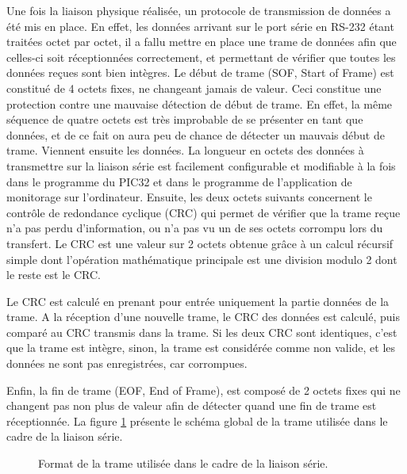 \documentclass[letterpaper, twoside, 12pt, memoire, creativecommons, hyperref]{thETS}
\begin{document}
Une fois la liaison physique réalisée, un protocole de transmission de données a été mis en place. En effet, les données arrivant sur le port série en RS-232 étant traitées octet par octet, il a fallu mettre en place une trame de données afin que celles-ci soit réceptionnées correctement, et permettant de vérifier que toutes les données reçues sont bien intègres.
Le début de trame (SOF, Start of Frame) est constitué de 4 octets fixes, ne changeant jamais de valeur. Ceci constitue une protection contre une mauvaise détection de début de trame. En effet, la même séquence de quatre octets est très improbable de se présenter en tant que données, et de ce fait on aura peu de chance de détecter un mauvais début de trame. Viennent ensuite les données. La longueur en octets des données à transmettre sur la liaison série est facilement configurable et modifiable à la fois dans le programme du PIC32 et dans le programme de l'application de monitorage sur l'ordinateur.
Ensuite, les deux octets suivants concernent le contrôle de redondance cyclique (CRC) qui permet de vérifier que la trame reçue n'a pas perdu d'information, ou n'a pas vu un de ses octets corrompu lors du transfert. Le CRC est une valeur sur 2 octets obtenue grâce à un calcul récursif simple dont l'opération mathématique principale est une division modulo 2 dont le reste est le CRC. %

Le CRC est calculé en prenant pour entrée uniquement la partie données de la trame. A la réception d'une nouvelle trame, le CRC des données est calculé, puis comparé au CRC transmis dans la trame. Si les deux CRC sont identiques, c'est que la trame est intègre, sinon, la trame est considérée comme non valide, et les données ne sont pas enregistrées, car corrompues.

Enfin, la fin de trame (EOF, End of Frame), est composé de 2 octets fixes qui ne changent pas non plus de valeur afin de détecter quand une fin de trame est réceptionnée. La figure \ref{fig:serialframe} présente le schéma global de la trame utilisée dans le cadre de la liaison série.

\begin{figure}
	\centering
	\caption{Format de la trame utilisée dans le cadre de la liaison série.}
	\label{fig:serialframe}
\end{figure}
\end{document}
